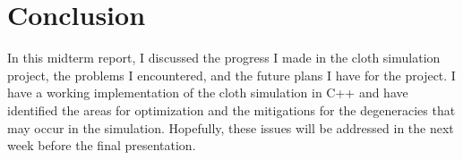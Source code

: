 \documentclass[letterpaper, 10 pt, conference]{ieeeconf}  %
\begin{document}
\section{Conclusion}

        In this midterm report, I discussed the progress I made in the cloth simulation project, the problems I encountered, and the future plans I have for the project. I have a working implementation of the cloth simulation in C++ and have identified the areas for optimization and the mitigations for the degeneracies that may occur in the simulation. Hopefully, these issues will be addressed in the next week before the final presentation.



\addtolength{\textheight}{-12cm}   %





\end{document}
